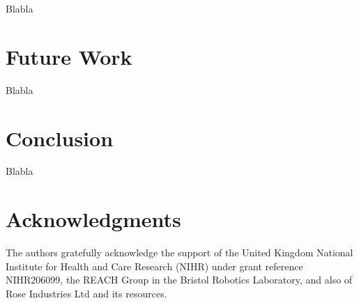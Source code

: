 \documentclass[conference]{IEEEtran}
\begin{document}
Blabla

\section{Future Work}

Blabla

\section{Conclusion}

Blabla

\section{Acknowledgments}

The authors gratefully acknowledge the support of the United Kingdom National Institute for Health and Care Research (NIHR) under grant reference NIHR206099, the REACH Group in the Bristol Robotics Laboratory, and also of Rose Industries Ltd and its resources.

\printbibliography[title=References]
\end{document}
